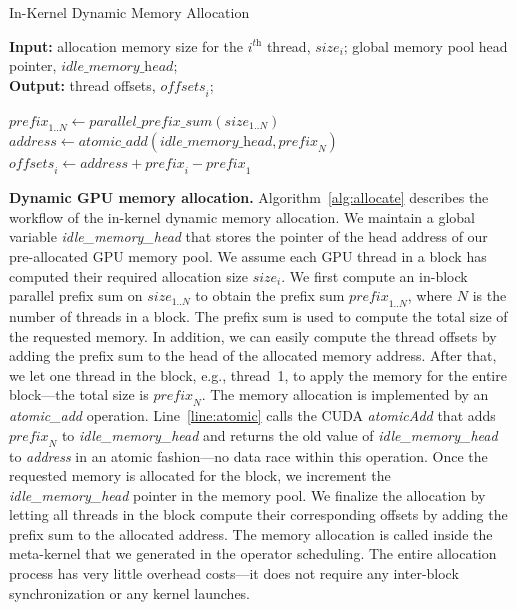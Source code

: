 \documentclass[sigconf]{acmart}
\begin{document}
\begin{algorithm}
\caption{In-Kernel Dynamic Memory Allocation}\label{alg:allocate}
\textbf{Input:} allocation memory size for the $i^\textit{th}$ thread, $\textit{size}_i$; global memory pool head pointer, $\textit{idle\_memory\_head}$;\\
\textbf{Output:} thread offsets, $\textit{offsets}_i$;
\begin{algorithmic}[1]
\STATE $\textit{prefix}_{1..N} \leftarrow \textit{parallel\_prefix\_sum}(\textit{size}_{1..N})$
\STATE $\textit{address} \leftarrow \textit{atomic\_add}(\textit{idle\_memory\_head},\textit{prefix}_N)$\label{line:atomic}
    \STATE $\textit{offsets}_i \leftarrow \textit{address} + \textit{prefix}_i- \textit{prefix}_1$
\ENDFOR
\end{algorithmic}
\end{algorithm}

\textbf{Dynamic GPU memory allocation.} Algorithm~\ref{alg:allocate} describes the workflow of the in-kernel dynamic memory allocation. We maintain a global variable \textit{idle\_memory\_head} that stores the pointer of the head address of our pre-allocated GPU memory pool. We assume each GPU thread in a block has computed their required allocation size $\textit{size}_i$. We first compute an in-block parallel prefix sum on $\textit{size}_{1..N}$ to obtain the prefix sum $\textit{prefix}_{1..N}$, where $N$ is the number of threads in a block. 
The prefix sum is used to compute the total size of the requested memory. In addition, we can easily compute the thread offsets by adding the prefix sum to the head of the allocated memory address. 
After that, we let one thread in the block, e.g., thread~1, to apply the memory for the entire block---the total size is $\textit{prefix}_N$. 
The memory allocation is implemented by an \textit{atomic\_add} operation. Line~\ref{line:atomic} calls the CUDA \textit{atomicAdd} that adds $\textit{prefix}_N$ to \textit{idle\_memory\_head} and returns the old value of \textit{idle\_memory\_head} to \textit{address} in an atomic fashion---no data race within this operation. 
Once the requested memory is allocated for the block, we increment the \textit{idle\_memory\_head} pointer in the memory pool. 
We finalize the allocation by letting all threads in the block compute their corresponding offsets by adding the prefix sum to the allocated address. 
The memory allocation is called inside the meta-kernel that we generated in the operator scheduling. 
The entire allocation process has very little overhead costs---it does not require any inter-block synchronization or any kernel launches. 
\end{document}
